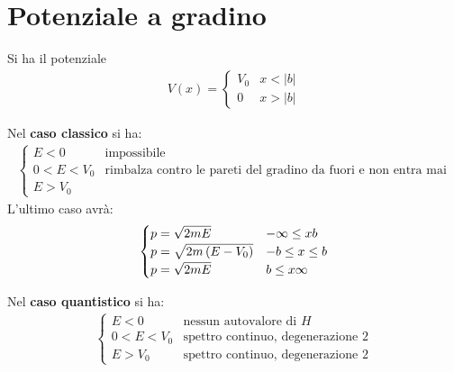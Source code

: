 \chapter{Potenziale a gradino} %
Si ha il potenziale
\begin{equation}\begin{split}
V\left(x\right)=\begin{cases}
V_0 & x<|b| \\
0 & x>|b|
\end{cases}
\end{split}\end{equation}

Nel \textbf{caso classico} si ha:
\begin{equation}\begin{split}
\begin{cases}
E<0 & \textrm{impossibile} \\
0<E<V_0 & \textrm{rimbalza contro le pareti del gradino da fuori e non entra mai}\\
E>V_0
\end{cases}
\end{split}\end{equation}
L'ultimo caso avrà:
\begin{equation}\begin{split}
\begin{cases}
p=\sqrt{2mE} & -\infty \le x\-b \\
p=\sqrt{2m\left(E-V_0\right)} & -b\le x\le b\\
p=\sqrt{2mE} & b\le x\infty
\end{cases}
\end{split}\end{equation}

Nel \textbf{caso quantistico} si ha:
\begin{equation}\begin{split}
\begin{cases}
E<0 & \textrm{nessun autovalore di }H\\
0<E<V_0 & \textrm{spettro continuo, degenerazione }2 \\
E>V_0 & \textrm{spettro continuo, degenerazione }2 
\end{cases}
\end{split}\end{equation}

